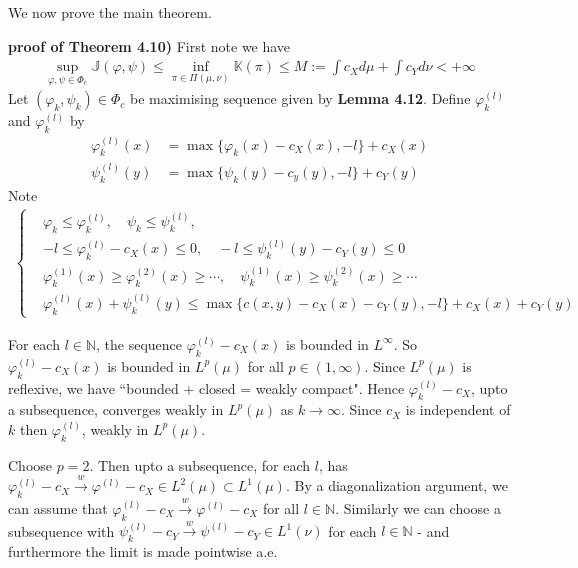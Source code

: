 \documentclass[12pt,a4paper]{article}
\newenvironment{proof}
{\begin{changemargin}{1cm}{0.5cm} 
	}%
	{\end{changemargin}
}
\newenvironment{p}
{\begin{proof} 
	}%
	{\end{proof}
}
\begin{document}
We now prove the main theorem.
\s

\begin{p}
\textbf{proof of Theorem 4.10)} First note we have
\begin{align*}
\sup_{\varphi, \psi \in \Phi_c}\mathbb{J}(\varphi, \psi) \leq \inf_{\pi \in \Pi(\mu, \nu)} \mathbb{K}(\pi) \leq M := \int c_Xd\mu + \int c_Y d\nu< +\infty
\end{align*}
\quad Let $(\varphi_k, \psi_k) \in \Phi_c$ be maximising sequence given by \textbf{Lemma 4.12}. Define $\varphi_k^{(l)}$ and $\varphi_k^{(l)}$ by
\begin{align*}
\varphi_k^{(l)}(x) &= \max \{\varphi_k(x) - c_X(x), - l\} + c_X(x) \\
\psi_k^{(l)}(y) &= \max \{ \psi_k(y)- c_y(y) , -l\} + c_Y(y)
\end{align*}
Note
\begin{align*}
\begin{cases}
& \varphi_k \leq \varphi_k^{(l)}, \quad \psi_k \leq \psi_k^{(l)},\\
& -l \leq \varphi_k^{(l)} - c_X(x) \leq 0, \quad  -l \leq \psi_k^{(l)}(y) - c_Y(y)\leq 0\\
& \varphi_k^{(1)}(x) \geq \varphi_k^{(2)}(x) \geq \cdots, \quad \psi_k^{(1)}(x) \geq \psi_k^{(2)}(x) \geq \cdots \\
& \varphi_k^{(l)}(x) + \psi_k^{(l)}(y) \leq \max \{ c(x,y) - c_X(x) - c_Y(y), -l\} + c_X(x) + c_Y(y)
\end{cases}
\end{align*}

\quad For each $l\in \mathbb{N}$, the sequence $\varphi_k^{(l)} - c_X(x)$ is bounded in $L^{\infty}$. So $\varphi_k^{(l)} - c_X(x)$ is bounded in $L^{p}(\mu)$ for all $p\in (1,\infty)$. Since $L^p(\mu)$ is reflexive, we have ``bounded + closed = weakly compact". Hence $\varphi_k^{(l)} -c_X$, upto a subsequence, converges weakly in $L^p(\mu)$ as $k\rightarrow \infty$. Since $c_X$ is independent of $k$ then $\varphi_k^{(l)}$, weakly in $L^p(\mu)$.

\quad Choose $p=2$. Then upto a subsequence, for each $l$, has $\varphi_k^{(l)} - c_X \xrightarrow{w} \varphi^{(l)} - c_X \in L^2(\mu) \subset L^1(\mu)$. By a diagonalization argument, we can assume that $\varphi_k^{(l)} - c_X  \xrightarrow{w} \varphi^{(l)}- c_X$ for all $l\in \mathbb{N}$. Similarly we can choose a subsequence with $\psi_k^{(l)} - c_Y\xrightarrow{w} \psi^{(l)} - c_Y \in L^1(\nu)$ for each $l\in \mathbb{N}$ - and furthermore the limit is made pointwise a.e.


\end{p}
\end{document}
